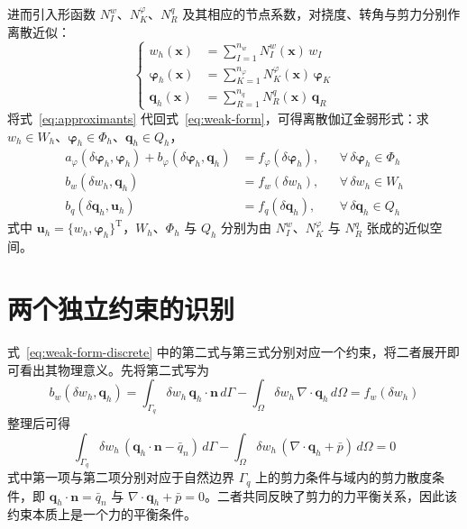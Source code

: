\documentclass[internationalmaster]{hquThesis}
\begin{document}
进而引入形函数 $N_I^w$、$N_K^\varphi$、$N_R^q$ 及其相应的节点系数，对挠度、转角与剪力分别作离散近似：
\begin{equation}
    \left\{
    \begin{aligned}
        w_h(\boldsymbol x) &= \sum_{I=1}^{n_w}N_I^w(\boldsymbol x)\,w_I\\
        \boldsymbol\varphi_h(\boldsymbol x) &= \sum_{K=1}^{n_\varphi}N_K^\varphi(\boldsymbol x)\,\boldsymbol\varphi_K\\
        \boldsymbol q_h(\boldsymbol x) &= \sum_{R=1}^{n_q}N_R^q(\boldsymbol x)\,\boldsymbol q_R
    \end{aligned}
    \right.
    \label{eq:approximants}
\end{equation}
将式~\eqref{eq:approximants} 代回式~\eqref{eq:weak-form}，可得离散伽辽金弱形式：求 $w_h\in W_h$、$\boldsymbol\varphi_h\in\Phi_h$、$\boldsymbol q_h\in Q_h$，
\begin{subequations}
    \label{eq:weak-form-discrete}
    \begin{align}
        a_\varphi(\delta\boldsymbol\varphi_h,\boldsymbol\varphi_h)+b_\varphi(\delta\boldsymbol\varphi_h,\boldsymbol q_h) &= f_\varphi(\delta\boldsymbol\varphi_h), &&\forall\,\delta\boldsymbol\varphi_h\in\Phi_h
        \label{eq:weak-phi-h}\\
        b_w(\delta w_h,\boldsymbol q_h) &= f_w(\delta w_h), &&\forall\,\delta w_h\in W_h
        \label{eq:weak-w-h}\\
        b_q(\delta\boldsymbol q_h,\boldsymbol u_h) &= f_q(\delta\boldsymbol q_h), &&\forall\,\delta\boldsymbol q_h\in Q_h
        \label{eq:weak-q-h}
    \end{align}
\end{subequations}
式中 $\boldsymbol u_h=\{w_h,\boldsymbol\varphi_h\}^{\mathrm{T}}$，$W_h$、$\Phi_h$ 与 $Q_h$ 分别为由 $N_I^w$、$N_K^\varphi$ 与 $N_R^q$ 张成的近似空间。

\section{两个独立约束的识别}

式~\eqref{eq:weak-form-discrete} 中的第二式与第三式分别对应一个约束，将二者展开即可看出其物理意义。先将第二式写为
\begin{equation}
    b_w(\delta w_h,\boldsymbol q_h)=\int_{\Gamma_q}\delta w_h\,\boldsymbol q_h\cdot\boldsymbol n\,d\Gamma-\int_\Omega \delta w_h\,\nabla\cdot\boldsymbol q_h\,d\Omega=f_w(\delta w_h)
    \label{eq:bw-expanded}
\end{equation}
整理后可得
\begin{equation}
    \int_{\Gamma_q}\delta w_h\,(\boldsymbol q_h\cdot\boldsymbol n-\bar{q}_n)\,d\Gamma
    -\int_\Omega \delta w_h\,(\nabla\cdot\boldsymbol q_h+\bar{p})\,d\Omega=0
    \label{eq:constraint-stress}
\end{equation}
式中第一项与第二项分别对应于自然边界 $\Gamma_q$ 上的剪力条件与域内的剪力散度条件，即 $\boldsymbol q_h\cdot\boldsymbol n=\bar{q}_n$ 与 $\nabla\cdot\boldsymbol q_h+\bar{p}=0$。二者共同反映了剪力的力平衡关系，因此该约束本质上是一个力的平衡条件。
\end{document}
